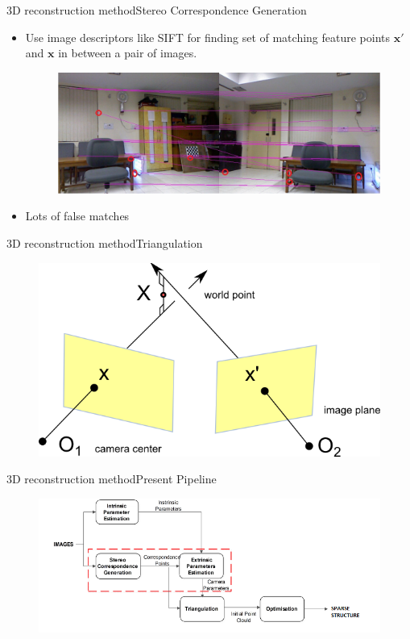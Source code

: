 \documentclass{beamer}
\begin{document}
\begin{frame}{3D reconstruction method}{Stereo Correspondence Generation}
  \begin{itemize}
    \item Use image descriptors like SIFT for finding set of matching feature points $\mathbf{x}'$ and $\mathbf{x}$ in between a pair of images.
  \begin{figure}[ht!]
    \centering
    \includegraphics[width=\linewidth]{siftcorres.jpg}
  \end{figure}
    \item Lots of false matches
  \end{itemize}
\end{frame}

\begin{frame}{3D reconstruction method}{Triangulation}
  \begin{figure}[ht!]
    \centering
    \includegraphics[width=0.6\linewidth]{triangulation.png}
  \end{figure}
\end{frame}

\begin{frame}{3D reconstruction method}{Present Pipeline}
  \begin{figure}[ht!]
    \centering
    \includegraphics[width=\linewidth]{traditional_paipeline.png}
  \end{figure}
\end{frame}
\end{document}
